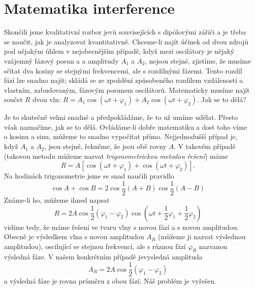   \section{Matematika interference}\label{fyz:IchapXXIXsecV}
    Skončili jsme kvalitativní rozbor jevů souvisejících s dipólovými zářiči a je třeba se naučit, 
    jak je analyzovat kvantitativně. Chceme-li najít účinek od dvou zdrojů pod nějakým úhlem v 
    nejobecnějším případě, když mezi oscilátory je nějaký vzájemný fázový posun a a amplitudy 
    \(A_1\) a \(A_2\), nejsou stejné, zjistíme, že musíme sčítat dva kosiny se stejnými 
    frekvencemi, ale s rozdílnými fázemi. Tento rozdíl fází lze snadno najít; skládá se ze zpoždění 
    způsobeného rozdílem vzdáleností a vlastním, zabudovaným, fázovým posunem oscilátorů. 
    Matematicky musíme najít součet \(R\) dvou vln: \(R = A_1\cos(\omega t + \varphi_1) + 
    A_2\cos(\omega t + \varphi_2)\). Jak se to dělá? 
    
    Je to skutečně velmi snadné a předpokládáme, že to už umíme udělat. Přesto však naznačíme, jak 
    se to dělá. Ovládáme-li dobře matematiku a dost toho víme o kosinu a sinu, můžeme to snadno 
    vypočítat přímo. Nejjednodušší případ je, když \(A_1\) a \(A_2\), jsou stejné, řekněme, že jsou 
    obě rovny \(A\). V takovém případě (takovou metodu můžeme nazvat \emph{trigonometrickou metodou 
    řešení}) máme
    \begin{equation}\label{fyz:eq311}
      R = A\left[\cos(\omega t + \varphi_1) + \cos(\omega t + \varphi_2)\right]. 
    \end{equation}
    Na hodinách trigonometrie jsme se snad naučili pravidlo
    \begin{equation}\label{fyz:eq309}
      \cos A + \cos B =2\cos\frac{1}{2}(A + B)\cos\frac{1}{2}(A - B)
    \end{equation}
    Známe-li ho, můžeme ihned napsat
    \begin{equation}\label{fyz:eq310}
      R = 2A\cos\frac{1}{2}(\varphi_1 - \varphi_2)
            \cos\left(\omega t + \frac{1}{2}\varphi_1 + \frac{1}{2}\varphi_2\right)
    \end{equation}
    vidíme tedy, že máme řešení ve tvaru vlny s novou fází a s novou amplitudou. Obecně je 
    výsledkem vlna s novou amplitudou \(A_R\) (můžeme ji nazvat výslednou amplitudou), oscilující 
    se stejnou frekvencí, ale s různou fází \(\varphi_R\) nazvanou výsledná fáze. V našem 
    konkrétním případě jevysledná amplituda
    \begin{equation}\label{fyz:eq312}
      A_R = 2A\cos\frac{1}{2}(\varphi_1 - \varphi_2)
    \end{equation}
    a výsledná fáze je rovna průměru z obou fází. Náš problém je vyřešen.
    
